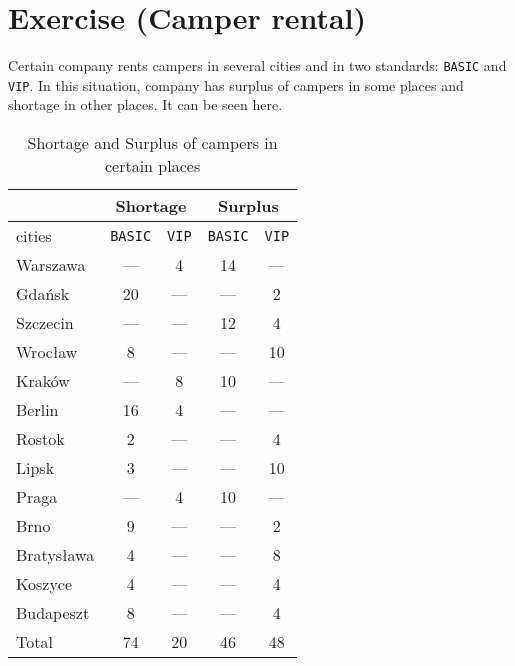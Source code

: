 \section{Exercise (Camper rental)}
Certain company rents campers in several cities and in two standards: \texttt{BASIC} and \texttt{VIP}.
In this situation, company has surplus of campers in some places and shortage in other places. It can be seen here.
\begin{table}[H]
    \centering
    \begin{tabular}{|l|lc|lc|}
    \hline
           & \multicolumn{2}{c|}{Shortage}    & \multicolumn{2}{c|}{Surplus}     \\ \hline
           cities & \multicolumn{1}{c|}{\texttt{BASIC}} & \texttt{VIP} & \multicolumn{1}{c|}{\texttt{BASIC}} & \texttt{VIP} \\ \hline
           Warszawa & \multicolumn{1}{c|}{---}      &   4  & \multicolumn{1}{c|}{14}      &   ---  \\
           Gdańsk & \multicolumn{1}{c|}{20}      &  ---   & \multicolumn{1}{c|}{---}      &  2   \\
           Szczecin & \multicolumn{1}{c|}{---}      &  ---   & \multicolumn{1}{c|}{12}      &  4   \\
           Wrocław & \multicolumn{1}{c|}{8}      &  ---   & \multicolumn{1}{c|}{---}      &  10   \\
           Kraków & \multicolumn{1}{c|}{---}      &   8  & \multicolumn{1}{c|}{10}      &   ---  \\
           Berlin & \multicolumn{1}{c|}{16}      &   4  & \multicolumn{1}{c|}{---}      &   ---  \\
           Rostok & \multicolumn{1}{c|}{2}      &   ---  & \multicolumn{1}{c|}{---}      &   4  \\
           Lipsk & \multicolumn{1}{c|}{3}      &  ---   & \multicolumn{1}{c|}{---}      &   10  \\
           Praga & \multicolumn{1}{c|}{---}      &  4   & \multicolumn{1}{c|}{10}      &  ---   \\
           Brno & \multicolumn{1}{c|}{9}      &   ---  & \multicolumn{1}{c|}{---}      &   2  \\
           Bratysława & \multicolumn{1}{c|}{4}      &   ---  & \multicolumn{1}{c|}{---}      &  8   \\ 
           Koszyce & \multicolumn{1}{c|}{4}      &   ---  & \multicolumn{1}{c|}{---}      &   4  \\
           Budapeszt & \multicolumn{1}{c|}{8}      &  ---   & \multicolumn{1}{c|}{---}      &  4   \\ \hline
           Total  & \multicolumn{1}{c|}{74}    & 20  & \multicolumn{1}{c|}{46}    & 48  \\ \hline 
    \end{tabular}
    \caption{Shortage and Surplus of campers in certain places}
    \label{ShortageSurplus}
\end{table}
